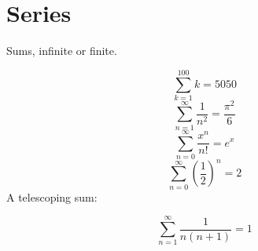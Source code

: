 \documentclass[11pt,a4paper]{article}
\theoremstyle{plain}
\theoremstyle{definition}
\theoremstyle{remark}
\begin{document}
\section*{Series}

Sums, infinite or finite.

\begin{equation*}
  \sum_{k=1}^{100} k = 5050
\end{equation*}
\begin{equation*}
  \sum_{n=1}^{\infty} \frac{1}{n^2} = \frac{\pi^{2}}{6}
\end{equation*}
\begin{equation*}
  \sum_{n=0}^{\infty} \frac{x^n}{n!} = e^{x}
\end{equation*}
\begin{equation*}
  \sum_{n=0}^{\infty} \left(\frac{1}{2}\right)^n = 2
\end{equation*}
A telescoping sum:

\begin{equation*}
  \sum_{n=1}^{\infty} \frac{1}{n (n + 1)} = 1
\end{equation*}
\end{document}
